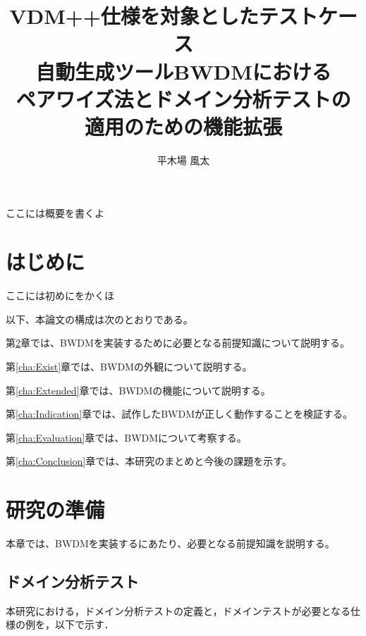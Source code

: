 \documentclass[uplatex, report, a4j, 10pt]{jsbook}
\title{VDM++仕様を対象としたテストケース \\ 自動生成ツールBWDMにおける \\ ペアワイズ法とドメイン分析テストの \\ 適用のための機能拡張}
\author{平木場 風太}
\newcommand{\tool}{BWDM}
\begin{document}
\maketitle


ここには概要を書くよ


%
\chapter{はじめに}\label{cha:Introduction}

ここには初めにをかくほ

以下、本論文の構成は次のとおりである。

第\ref{cha:Preparation}章では、\tool{}を実装するために必要となる前提知識について説明する。

第\ref{cha:Exist}章では、\tool{}の外観について説明する。

第\ref{cha:Extended}章では、\tool{}の機能について説明する。

第\ref{cha:Indication}章では、試作した\tool{}が正しく動作することを検証する。

第\ref{cha:Evaluation}章では、\tool{}について考察する。

第\ref{cha:Conclusion}章では、本研究のまとめと今後の課題を示す。



\chapter{研究の準備}\label{cha:Preparation}

本章では、\tool{}を実装するにあたり、必要となる前提知識を説明する。

\section{ドメイン分析テスト}\label{cha:domain}
本研究における，ドメイン分析テストの定義と，ドメインテストが必要となる仕様の例を，以下で示す．
\end{document}
